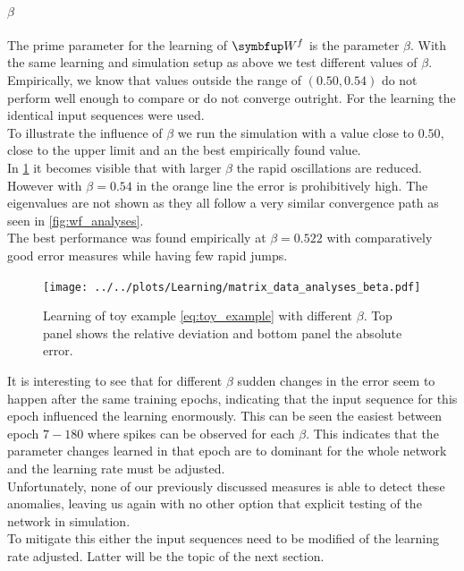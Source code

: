 \paragraph{$\beta$}
The prime parameter for the learning of $\bmu{W}^f$ is the parameter $\beta$. With the same learning and simulation setup as above we test different values of $\beta$. Empirically, we know that values outside the range of $(0.50,0.54)$ do not perform well enough to compare or do not converge outright. For the learning the identical input sequences were used.\\
To illustrate the influence of $\beta$ we run the simulation with a value close to $0.50$, close to the upper limit and an the best empirically found value.\\
In \cref{fig:beta_study} it becomes visible that with larger $\beta$ the rapid oscillations are reduced. However with $\beta = 0.54$ in the orange line the error is prohibitively high. The eigenvalues are not shown as they all follow a very similar convergence path as seen in \cref{fig:wf_analyses}.\\
The best performance was found empirically at $\beta = 0.522$ with comparatively good error measures while having few rapid jumps.\\
\begin{figure}
	\centering
	\texttt{[image: ../../plots/Learning/matrix\_data\_analyses\_beta.pdf]}
	\caption{Learning of toy example \cref{eq:toy_example} with different $\beta$. Top panel shows the relative deviation and bottom panel the absolute error.}
	\label{fig:beta_study}
\end{figure}

It is interesting to see that for different $\beta$ sudden changes in the error seem to happen after the same training epochs, indicating that the input sequence for this epoch influenced the learning enormously. This can be seen the easiest between epoch $7-180$ where spikes can be observed for each $\beta$. This indicates that the parameter changes learned in that epoch are to dominant for the whole network and the learning rate must be adjusted.\\
Unfortunately, none of our previously discussed measures is able to detect these anomalies, leaving us again with no other option that explicit testing of the network in simulation.\\
To mitigate this either the input sequences need to be modified of the learning rate adjusted. Latter will be the topic of the next section.\\


